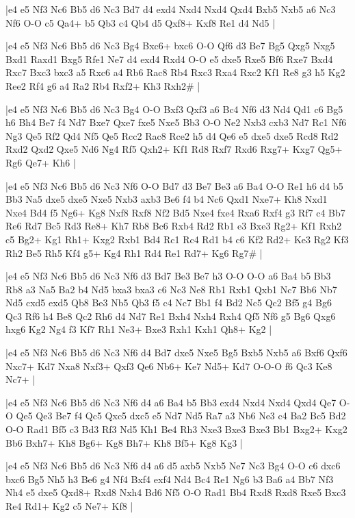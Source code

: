 \whitename{}
\blackname{}
\makegametitle
|e4 e5 Nf3 Nc6 Bb5 d6 Nc3 Bd7 d4 exd4 Nxd4 Nxd4 Qxd4 Bxb5 Nxb5 a6 Nc3 Nf6 O-O c5 Qa4+ b5 Qb3 c4 Qb4 d5 Qxf8+ Kxf8 Re1 d4 Nd5  |

\whitename{}
\blackname{}
\makegametitle
|e4 e5 Nf3 Nc6 Bb5 d6 Nc3 Bg4 Bxc6+ bxc6 O-O Qf6 d3 Be7 Bg5 Qxg5 Nxg5 Bxd1 Raxd1 Bxg5 Rfe1 Ne7 d4 exd4 Rxd4 O-O e5 dxe5 Rxe5 Bf6 Rxe7 Bxd4 Rxc7 Bxc3 bxc3 a5 Rxc6 a4 Rb6 Rac8 Rb4 Rxc3 Rxa4 Rxc2 Kf1 Re8 g3 h5 Kg2 Ree2 Rf4 g6 a4 Ra2 Rb4 Rxf2+ Kh3 Rxh2\#  |

\whitename{}
\blackname{}
\makegametitle
|e4 e5 Nf3 Nc6 Bb5 d6 Nc3 Bg4 O-O Bxf3 Qxf3 a6 Bc4 Nf6 d3 Nd4 Qd1 c6 Bg5 h6 Bh4 Be7 f4 Nd7 Bxe7 Qxe7 fxe5 Nxe5 Bb3 O-O Ne2 Nxb3 cxb3 Nd7 Rc1 Nf6 Ng3 Qe5 Rf2 Qd4 Nf5 Qe5 Rcc2 Rac8 Rce2 h5 d4 Qe6 e5 dxe5 dxe5 Rcd8 Rd2 Rxd2 Qxd2 Qxe5 Nd6 Ng4 Rf5 Qxh2+ Kf1 Rd8 Rxf7 Rxd6 Rxg7+ Kxg7 Qg5+ Rg6 Qe7+ Kh6  |

\whitename{}
\blackname{}
\makegametitle
|e4 e5 Nf3 Nc6 Bb5 d6 Nc3 Nf6 O-O Bd7 d3 Be7 Be3 a6 Ba4 O-O Re1 h6 d4 b5 Bb3 Na5 dxe5 dxe5 Nxe5 Nxb3 axb3 Be6 f4 b4 Nc6 Qxd1 Nxe7+ Kh8 Nxd1 Nxe4 Bd4 f5 Ng6+ Kg8 Nxf8 Rxf8 Nf2 Bd5 Nxe4 fxe4 Rxa6 Rxf4 g3 Rf7 c4 Bb7 Re6 Rd7 Bc5 Rd3 Re8+ Kh7 Rb8 Bc6 Rxb4 Rd2 Rb1 e3 Bxe3 Rg2+ Kf1 Rxh2 c5 Bg2+ Kg1 Rh1+ Kxg2 Rxb1 Bd4 Rc1 Rc4 Rd1 b4 c6 Kf2 Rd2+ Ke3 Rg2 Kf3 Rh2 Be5 Rh5 Kf4 g5+ Kg4 Rh1 Rd4 Re1 Rd7+ Kg6 Rg7\#  |

\whitename{}
\blackname{}
\makegametitle
|e4 e5 Nf3 Nc6 Bb5 d6 Nc3 Nf6 d3 Bd7 Be3 Be7 h3 O-O O-O a6 Ba4 b5 Bb3 Rb8 a3 Na5 Ba2 b4 Nd5 bxa3 bxa3 c6 Nc3 Ne8 Rb1 Rxb1 Qxb1 Nc7 Bb6 Nb7 Nd5 cxd5 exd5 Qb8 Be3 Nb5 Qb3 f5 c4 Nc7 Bb1 f4 Bd2 Nc5 Qc2 Bf5 g4 Bg6 Qc3 Rf6 h4 Be8 Qc2 Rh6 d4 Nd7 Re1 Bxh4 Nxh4 Rxh4 Qf5 Nf6 g5 Bg6 Qxg6 hxg6 Kg2 Ng4 f3 Kf7 Rh1 Ne3+ Bxe3 Rxh1 Kxh1 Qh8+ Kg2  |

\whitename{}
\blackname{}
\makegametitle
|e4 e5 Nf3 Nc6 Bb5 d6 Nc3 Nf6 d4 Bd7 dxe5 Nxe5 Bg5 Bxb5 Nxb5 a6 Bxf6 Qxf6 Nxc7+ Kd7 Nxa8 Nxf3+ Qxf3 Qe6 Nb6+ Ke7 Nd5+ Kd7 O-O-O f6 Qc3 Ke8 Nc7+  |

\whitename{}
\blackname{}
\makegametitle
|e4 e5 Nf3 Nc6 Bb5 d6 Nc3 Nf6 d4 a6 Ba4 b5 Bb3 exd4 Nxd4 Nxd4 Qxd4 Qe7 O-O Qe5 Qe3 Be7 f4 Qc5 Qxc5 dxc5 e5 Nd7 Nd5 Ra7 a3 Nb6 Ne3 c4 Ba2 Bc5 Bd2 O-O Rad1 Bf5 c3 Bd3 Rf3 Nd5 Kh1 Be4 Rh3 Nxe3 Bxe3 Bxe3 Bb1 Bxg2+ Kxg2 Bb6 Bxh7+ Kh8 Bg6+ Kg8 Bh7+ Kh8 Bf5+ Kg8 Kg3  |

\whitename{}
\blackname{}
\makegametitle
|e4 e5 Nf3 Nc6 Bb5 d6 Nc3 Nf6 d4 a6 d5 axb5 Nxb5 Ne7 Nc3 Bg4 O-O c6 dxc6 bxc6 Bg5 Nh5 h3 Be6 g4 Nf4 Bxf4 exf4 Nd4 Bc4 Re1 Ng6 b3 Ba6 a4 Bb7 Nf3 Nh4 e5 dxe5 Qxd8+ Rxd8 Nxh4 Bd6 Nf5 O-O Rad1 Bb4 Rxd8 Rxd8 Rxe5 Bxc3 Re4 Rd1+ Kg2 c5 Ne7+ Kf8  |

